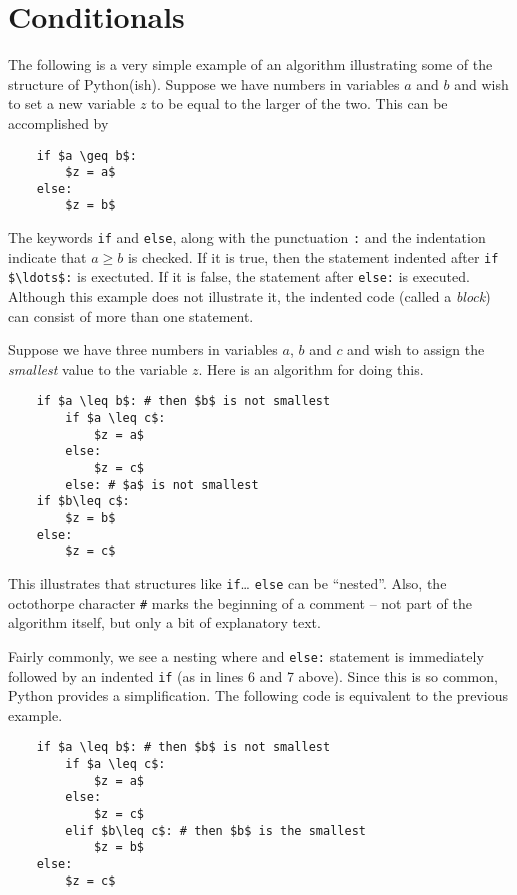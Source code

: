 \ipadbreak

\section{Conditionals}

The following is a very simple example of an algorithm
illustrating some of the structure of Python(ish). Suppose we have
numbers in variables $a$ and $b$ and wish to set a new variable $z$ to
be equal to the larger of the two. This can be accomplished by
\begin{code}
	\begin{lstlisting}
	if $a \geq b$: 
		$z = a$
	else: 
		$z = b$
	\end{lstlisting}
\end{code}

The keywords \lstinline|if| and \lstinline|else|, along with the
punctuation \lstinline|:| and the indentation indicate that $a\geq b$
is checked. If it is true, then the statement indented after
\lstinline|if $\ldots$:| is exectuted.  If it is false, the statement
after \lstinline|else:| is executed. Although this example does not
illustrate it, the indented code (called a \emph{block}) can consist
of more than one statement.

\ipadbreak

Suppose we have three numbers in variables $a$, $b$ and $c$ and wish
to assign the \emph{smallest} value to the variable $z$.  Here is an
algorithm for doing this.
\begin{code}
	\begin{lstlisting}
	if $a \leq b$: # then $b$ is not smallest 
		if $a \leq c$:
			$z = a$
		else: 
			$z = c$ 
		else: # $a$ is not smallest 
	if $b\leq c$: 
		$z = b$
	else: 
		$z = c$
	\end{lstlisting}
\end{code}
This illustrates that structures like \lstinline|if|\ldots
\lstinline|else| can be ``nested''. Also, the octothorpe character
\verb|#| marks the beginning of a comment -- not part of the 
algorithm itself, but only a bit of explanatory text.

\ipadbreak

Fairly commonly, we see a nesting where and \lstinline|else:|
statement is immediately followed by an indented \lstinline|if| (as in
lines 6 and 7 above).  Since this is so common, Python provides a
simplification. The following code is equivalent to the previous
example.
\begin{code}
	\begin{lstlisting}
	if $a \leq b$: # then $b$ is not smallest 
		if $a \leq c$: 
			$z = a$
		else: 
			$z = c$ 
		elif $b\leq c$: # then $b$ is the smallest 
			$z = b$
	else: 
		$z = c$
	\end{lstlisting}
\end{code}

